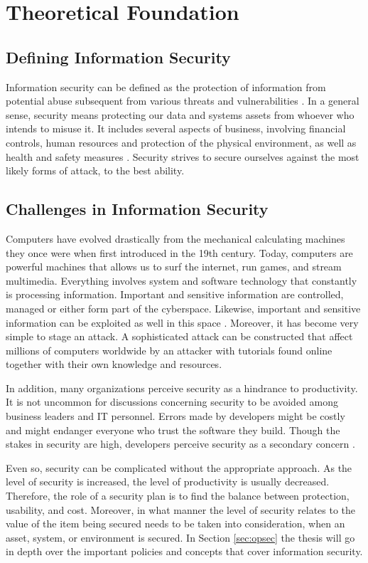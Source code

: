 \section{Theoretical Foundation}

\subsection{Defining Information Security}
Information security can be defined as the protection of information from potential abuse subsequent from various threats and vulnerabilities \cite{von_Solms_2013}. In a general sense, security means protecting our data and systems assets from whoever who intends to misuse it. It includes several aspects of business, involving financial controls, human resources and protection of the physical environment, as well as health and safety measures \cite{zinatullin2016the}. Security strives to secure ourselves against the most likely forms of attack, to the best ability.


\subsection{Challenges in Information Security}\label{sec:challenges-in-is}
Computers have evolved drastically from the mechanical calculating machines they once were when first introduced in the 19th century. Today, computers are powerful machines that allows us to surf the internet, run games, and stream multimedia. Everything involves system and software technology that constantly is processing information. Important and sensitive information are controlled, managed or either form part of the cyberspace. Likewise, important and sensitive information can be exploited as well in this space \cite{Li_2021}. Moreover, it has become very simple to stage an attack. A sophisticated attack can be constructed that affect millions of computers worldwide by an attacker with tutorials found online together with their own knowledge and resources. 

In addition, many organizations perceive security as a hindrance to productivity. It is not uncommon for discussions concerning security to be avoided  among business leaders and IT personnel. Errors made by developers might be costly and might endanger everyone who trust the software they build. Though the stakes in security are high, developers perceive security as a secondary concern \cite{Lopez_2019}. 

Even so, security can be complicated without the appropriate approach. As the level of security is increased, the level of productivity is usually decreased. Therefore, the role of a security plan is to find the balance between protection, usability, and cost. Moreover, in what manner the level of security relates to the value of the item being secured needs to be taken into consideration, when an asset, system, or environment is secured. In Section \ref{sec:opsec} the thesis will go in depth over the important policies and concepts that cover information security.

